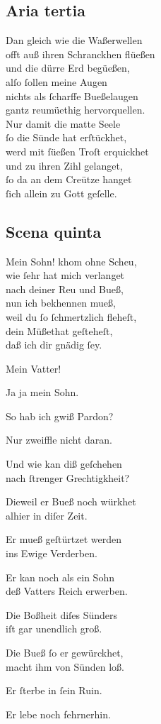 \documentclass{ees}
\newenvironment{lyrics}[1]{%
  \subsection{#1}\nopagebreak%
  \begin{lyricslist}%
  \let\voice\item%
}{%
  \end{lyricslist}%
}
\newcommand\voiceSohn{\voice[Sohn]}
\newcommand\voiceBarmherzigkeit{\voice[Barmh.]}
\newcommand\voiceGerechtigkeit{\voice[Gerecht.]}
\newcommand\voiceVater{\voice[Vatter]}
\begin{document}
\begin{lyrics}{Aria tertia}
  \voiceSohn
  Dan gleich wie die Waßerwellen\\
  offt auß ihren Schranckhen flüeßen\\
  und die dürre Erd begüeßen,\\
  alſo ſollen meine Augen\\
  nichts als ſcharffe Bueßelaugen\\
  gantz reumüethig hervorquellen.\\[1ex]
  Nur damit die matte Seele\\
  ſo die Sünde hat erſtückhet,\\
  werd mit ſüeßen Troſt erquickhet\\
  und zu ihren Zihl gelanget,\\
  ſo da an dem Creütze hanget\\
  ſich allein zu Gott geſelle.
\end{lyrics}

\begin{lyrics}{Scena quinta}
  \voiceVater
  Mein Sohn! khom ohne Scheu,\\
  wie ſehr hat mich verlanget\\
  nach deiner Reu und Bueß,\\
  nun ich bekhennen mueß,\\
  weil du ſo ſchmertzlich fleheſt,\\
  dein Müßethat geſteheſt,\\
  daß ich dir gnädig ſey.

  \voiceSohn
  Mein Vatter!

  \voiceVater
  Ja ja mein Sohn.

  \voiceSohn
  So hab ich gwiß Pardon?

  \voiceVater
  Nur zweiffle nicht daran.

  \voiceGerechtigkeit
  Und wie kan diß geſchehen\\
  nach ſtrenger Grechtigkheit?

  \voiceBarmherzigkeit
  Dieweil er Bueß noch würkhet\\
  alhier in diſer Zeit.

  \voiceGerechtigkeit
  Er mueß geſtürtzet werden\\
  ins Ewige Verderben.

  \voiceBarmherzigkeit
  Er kan noch als ein Sohn\\
  deß Vatters Reich erwerben.

  \voiceGerechtigkeit
  Die Boßheit diſes Sünders\\
  iſt gar unendlich groß.

  \voiceBarmherzigkeit
  Die Bueß ſo er gewürckhet,\\
  macht ihm von Sünden loß.

  \voiceGerechtigkeit
  Er ſterbe in ſein Ruin.

  \voiceBarmherzigkeit
  Er lebe noch fehrnerhin.
\end{lyrics}
\end{document}
